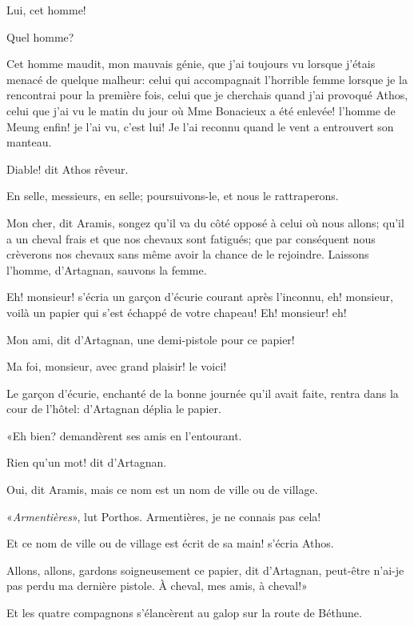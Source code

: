 \speak  Lui, cet homme! 

\speak  Quel homme? 

\speak  Cet homme maudit, mon mauvais génie, que j'ai toujours vu lorsque j'étais menacé de quelque malheur: celui qui accompagnait l'horrible femme lorsque je la rencontrai pour la première fois, celui que je cherchais quand j'ai provoqué Athos, celui que j'ai vu le matin du jour où Mme Bonacieux a été enlevée! l'homme de Meung enfin! je l'ai vu, c'est lui! Je l'ai reconnu quand le vent a entrouvert son manteau. 

\speak  Diable! dit Athos rêveur. 

\speak  En selle, messieurs, en selle; poursuivons-le, et nous le rattraperons. 

\speak  Mon cher, dit Aramis, songez qu'il va du côté opposé à celui où nous allons; qu'il a un cheval frais et que nos chevaux sont fatigués; que par conséquent nous crèverons nos chevaux sans même avoir la chance de le rejoindre. Laissons l'homme, d'Artagnan, sauvons la femme. 

\speak  Eh! monsieur! s'écria un garçon d'écurie courant après l'inconnu, eh! monsieur, voilà un papier qui s'est échappé de votre chapeau! Eh! monsieur! eh! 

\speak  Mon ami, dit d'Artagnan, une demi-pistole pour ce papier! 

\speak  Ma foi, monsieur, avec grand plaisir! le voici! 

Le garçon d'écurie, enchanté de la bonne journée qu'il avait faite, rentra dans la cour de l'hôtel: d'Artagnan déplia le papier. 

«Eh bien? demandèrent ses amis en l'entourant. 

\speak  Rien qu'un mot! dit d'Artagnan. 

\speak  Oui, dit Aramis, mais ce nom est un nom de ville ou de village. 

\speak «\textit{Armentières}», lut Porthos. Armentières, je ne connais pas cela! 

\speak  Et ce nom de ville ou de village est écrit de sa main! s'écria Athos. 

\speak  Allons, allons, gardons soigneusement ce papier, dit d'Artagnan, peut-être n'ai-je pas perdu ma dernière pistole. À cheval, mes amis, à cheval!» 

Et les quatre compagnons s'élancèrent au galop sur la route de Béthune.